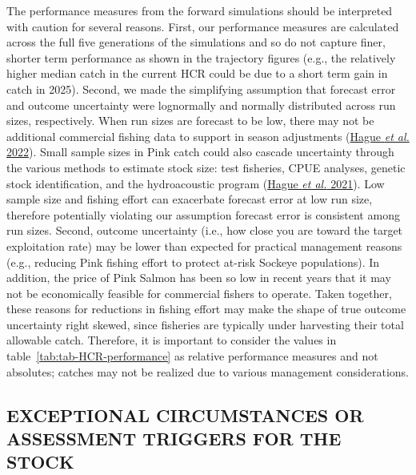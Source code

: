 \documentclass[french,11pt]{book}
\begin{document}
The performance measures from the forward simulations should be interpreted with caution for several reasons. First, our performance measures are calculated across the full five generations of the simulations and so do not capture finer, shorter term performance as shown in the trajectory figures (e.g., the relatively higher median catch in the current HCR could be due to a short term gain in catch in 2025). Second, we made the simplifying assumption that forecast error and outcome uncertainty were lognormally and normally distributed across run sizes, respectively. When run sizes are forecast to be low, there may not be additional commercial fishing data to support in season adjustments (\protect\hyperlink{ref-hagueImprovementsFraserRiver2022}{Hague \emph{et al.} 2022}). Small sample sizes in Pink catch could also cascade uncertainty through the various methods to estimate stock size: test fisheries, CPUE analyses, genetic stock identification, and the hydroacoustic program (\protect\hyperlink{ref-hagueMovingTargetsAssessing2021}{Hague \emph{et al.} 2021}). Low sample size and fishing effort can exacerbate forecast error at low run size, therefore potentially violating our assumption forecast error is consistent among run sizes. Second, outcome uncertainty (i.e., how close you are toward the target exploitation rate) may be lower than expected for practical management reasons (e.g., reducing Pink fishing effort to protect at-risk Sockeye populations). In addition, the price of Pink Salmon has been so low in recent years that it may not be economically feasible for commercial fishers to operate. Taken together, these reasons for reductions in fishing effort may make the shape of true outcome uncertainty right skewed, since fisheries are typically under harvesting their total allowable catch. Therefore, it is important to consider the values in table~\ref{tab:tab-HCR-performance} as relative performance measures and not absolutes; catches may not be realized due to various management considerations.

\hypertarget{exceptional-circumstances-or-assessment-triggers-for-the-stock}{%
\subsection{EXCEPTIONAL CIRCUMSTANCES OR ASSESSMENT TRIGGERS FOR THE STOCK}\label{exceptional-circumstances-or-assessment-triggers-for-the-stock}}
\end{document}
